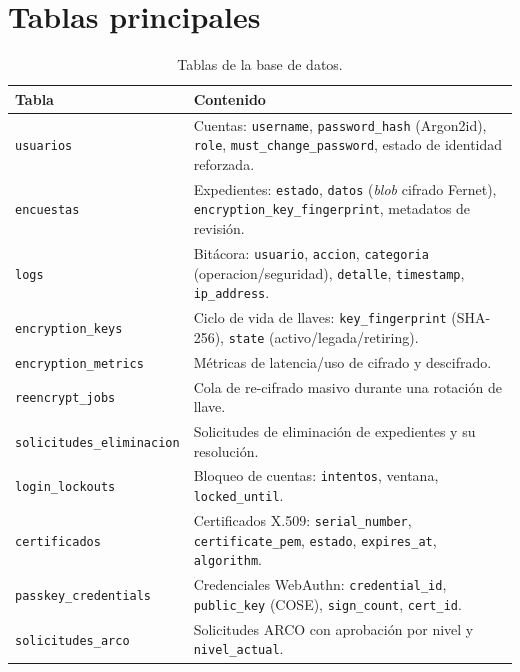 \documentclass[10pt,letterpaper]{report}
\begin{document}
\section{Tablas principales}
\begin{table}[h]
\centering
\renewcommand{\arraystretch}{1.2}
\begin{tabularx}{\textwidth}{l X}
\toprule
\textbf{Tabla} & \textbf{Contenido} \\
\midrule
\texttt{usuarios} & Cuentas: \texttt{username}, \texttt{password\_hash} (Argon2id), \texttt{role}, \texttt{must\_change\_password}, estado de identidad reforzada. \\
\texttt{encuestas} & Expedientes: \texttt{estado}, \texttt{datos} (\emph{blob} cifrado Fernet), \texttt{encryption\_key\_fingerprint}, metadatos de revisi\'on. \\
\texttt{logs} & Bit\'acora: \texttt{usuario}, \texttt{accion}, \texttt{categoria} (operacion/seguridad), \texttt{detalle}, \texttt{timestamp}, \texttt{ip\_address}. \\
\texttt{encryption\_keys} & Ciclo de vida de llaves: \texttt{key\_fingerprint} (SHA-256), \texttt{state} (activo/legada/retiring). \\
\texttt{encryption\_metrics} & M\'etricas de latencia/uso de cifrado y descifrado. \\
\texttt{reencrypt\_jobs} & Cola de re-cifrado masivo durante una rotaci\'on de llave. \\
\texttt{solicitudes\_eliminacion} & Solicitudes de eliminaci\'on de expedientes y su resoluci\'on. \\
\texttt{login\_lockouts} & Bloqueo de cuentas: \texttt{intentos}, ventana, \texttt{locked\_until}. \\
\texttt{certificados} & Certificados X.509: \texttt{serial\_number}, \texttt{certificate\_pem}, \texttt{estado}, \texttt{expires\_at}, \texttt{algorithm}. \\
\texttt{passkey\_credentials} & Credenciales WebAuthn: \texttt{credential\_id}, \texttt{public\_key} (COSE), \texttt{sign\_count}, \texttt{cert\_id}. \\
\texttt{solicitudes\_arco} & Solicitudes ARCO con aprobaci\'on por nivel y \texttt{nivel\_actual}. \\
\bottomrule
\end{tabularx}
\caption{Tablas de la base de datos.}
\label{tab:tablas}
\end{table}
\end{document}

